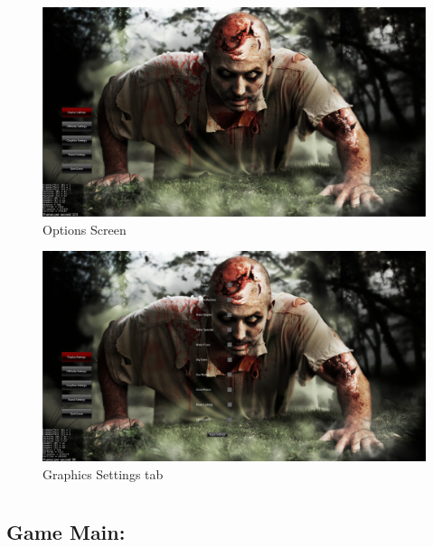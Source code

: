 \documentclass[letterpaper]{article}
\begin{document}
			
		\begin{figure}[H]
		\centering
		\includegraphics[width=130mm]{GUI_ScreenShots/OptionsScreen.jpg}
		\caption{Options Screen}
		\end{figure}
		
			
		\begin{figure}[H]
		\centering
		\includegraphics[width=130mm]{GUI_ScreenShots/GraphicsSettings.jpg}
		\caption{Graphics Settings tab}
		\end{figure}
		
		
		\vspace{0.2in}
		
		\section*{\colorbox{blue}{}} 
		\vspace{0.1in}
		
			\subsection*{Game Main:}
			\vspace{0.1in}
				
\end{document}
